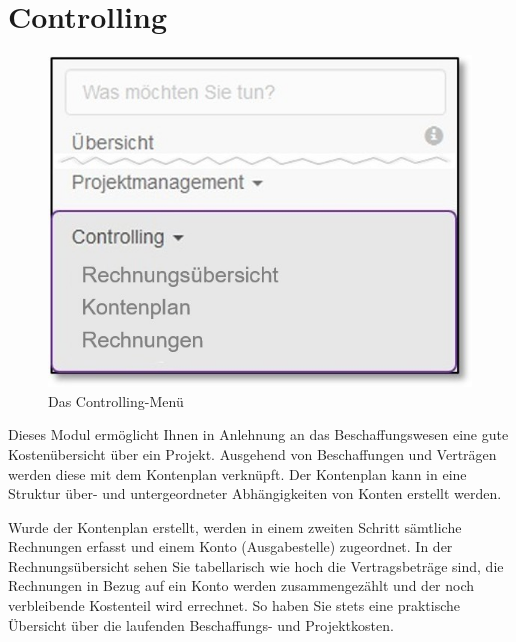 
\clearpage
\section{Controlling}

\begin{figure}   %
  \vspace{-35pt}      %
  \begin{center}
    \includegraphics[width=1\linewidth]{../chapters/09_Controlling/pictures/contr_Uebersicht.jpg}
  \end{center}
  \vspace{-20pt}
  \caption{Das Controlling-Menü}
  \vspace{-10pt}
\end{figure}

Dieses Modul ermöglicht Ihnen in Anlehnung an das Beschaffungswesen eine gute Kostenübersicht über ein Projekt.
Ausgehend von Beschaffungen und Verträgen werden diese mit dem Kontenplan verknüpft. Der Kontenplan kann in eine Struktur über- und untergeordneter Abhängigkeiten von Konten erstellt werden.

\vspace{2cm} 

Wurde der Kontenplan erstellt, werden in einem zweiten Schritt sämtliche Rechnungen erfasst und einem Konto (Ausgabestelle) zugeordnet. In der Rechnungsübersicht sehen Sie tabellarisch wie hoch die Vertragsbeträge sind, die Rechnungen in Bezug auf ein Konto werden zusammengezählt und der noch verbleibende Kostenteil wird errechnet. So haben Sie stets eine praktische Übersicht über die laufenden Beschaffungs- und Projektkosten.


